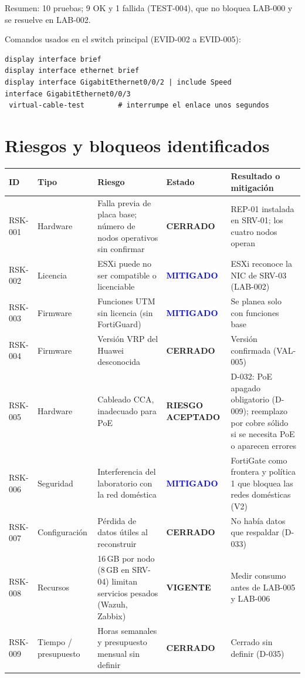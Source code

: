 \documentclass[11pt,a4paper]{article}
\newcommand{\estadobase}[2]{\textcolor{#1}{\textbf{\footnotesize #2}}}
\newcommand{\cerr}{\estadobase{okgreen}{CERRADO}}
\newcommand{\mitig}{\estadobase{blue}{MITIGADO}}
\newcommand{\acep}{\estadobase{amber}{RIESGO ACEPTADO}}
\newcommand{\vig}{\estadobase{amber}{VIGENTE}}
\begin{document}
Resumen: 10 pruebas; 9 OK y 1 fallida (TEST-004), que no bloquea LAB-000 y se resuelve en LAB-002.

Comandos usados en el switch principal (EVID-002 a EVID-005):
\begin{lstlisting}
display interface brief
display interface ethernet brief
display interface GigabitEthernet0/0/2 | include Speed
interface GigabitEthernet0/0/3
 virtual-cable-test        # interrumpe el enlace unos segundos
\end{lstlisting}

\section{Riesgos y bloqueos identificados}
{\small
\begin{longtable}{L{1.5cm} L{2.2cm} L{4.0cm} L{2.6cm} L{3.8cm}}
  \toprule
  \textbf{ID} & \textbf{Tipo} & \textbf{Riesgo} & \textbf{Estado} & \textbf{Resultado o mitigación}\\
  \midrule
  \endhead
  RSK-001 & Hardware & Falla previa de placa base; número de nodos operativos sin confirmar & \cerr & REP-01 instalada en SRV-01; los cuatro nodos operan\\
  RSK-002 & Licencia & ESXi puede no ser compatible o licenciable & \mitig & ESXi reconoce la NIC de SRV-03 (LAB-002)\\
  RSK-003 & Firmware & Funciones UTM sin licencia (sin FortiGuard) & \mitig & Se planea solo con funciones base\\
  RSK-004 & Firmware & Versión VRP del Huawei desconocida & \cerr & Versión confirmada (VAL-005)\\
  RSK-005 & Hardware & Cableado CCA, inadecuado para PoE & \acep & D-032: PoE apagado obligatorio (D-009); reemplazo por cobre sólido si se necesita PoE o aparecen errores\\
  RSK-006 & Seguridad & Interferencia del laboratorio con la red doméstica & \mitig & FortiGate como frontera y política 1 que bloquea las redes domésticas (V2)\\
  RSK-007 & Configuración & Pérdida de datos útiles al reconstruir & \cerr & No había datos que respaldar (D-033)\\
  RSK-008 & Recursos & 16\,GB por nodo (8\,GB en SRV-04) limitan servicios pesados (Wazuh, Zabbix) & \vig & Medir consumo antes de LAB-005 y LAB-006\\
  RSK-009 & Tiempo / presupuesto & Horas semanales y presupuesto mensual sin definir & \cerr & Cerrado sin definir (D-035)\\
  \bottomrule
\end{longtable}
}
\end{document}
